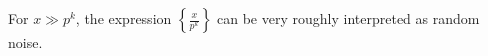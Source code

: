\documentclass[english, parskip=full]{scrartcl}
\renewcommand{\bra}{}
\newcommand{\klam}{}
\newcommand{\klammer}{}
\begin{document}
For $x \gg p^k$, the expression $\klammer\left\{ \frac{x}{p^k} \right\}$ can be very roughly interpreted as random noise.
\end{document}
